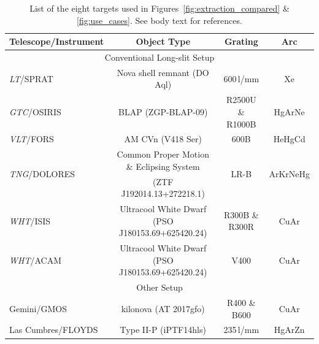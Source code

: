 \documentclass[linenumbers, twocolumn]{aastex631}
\begin{document}
\begin{table}
    \begin{tabular}{l|c|c|c}\hline
        Telescope/Instrument & Object Type                                 & Grating             & Arc \\\hline\hline
        \multicolumn{4}{c}{Conventional Long-slit Setup}\\\hline
        \textit{LT}/SPRAT      & Nova shell remnant (DO Aql)                 & 600\,l/mm           & Xe \\
        \textit{GTC}/OSIRIS           & BLAP (ZGP-BLAP-09)                          & R2500U \& R1000B    & HgArNe \\
        \textit{VLT}/FORS             & AM CVn (V418 Ser)                           & 600B                & HeHgCd \\
        \multirow{2}{*}{\textit{TNG}/DOLORES}          & Common Proper Motion \& Eclipsing System     & \multirow{2}{*}{LR-B}                & \multirow{2}{*}{ArKrNeHg} \\
                             & (ZTF J192014.13+272218.1)     &           &  \\
        \textit{WHT}/ISIS             & Ultracool White Dwarf (PSO J180153.69+625420.24)       & R300B \& R300R      & CuAr \\
        \textit{WHT}/ACAM             & Ultracool White Dwarf (PSO J180153.69+625420.24)       & V400                & CuAr \\\hline
        \multicolumn{4}{c}{Other Setup}\\\hline
        Gemini/GMOS          & kilonova (AT 2017gfo)                       & R400 \& B600        & CuAr \\
        Las Cumbres/FLOYDS           & Type II-P (iPTF14hls)                       & 235\,l/mm           & HgArZn \\\hline
\end{tabular}
    \caption{List of the eight targets used in Figures~\ref{fig:extraction_compared} \& \ref{fig:use_cases}. See body text for references.}
    \label{tab:my_label}
\end{table}
\end{document}
